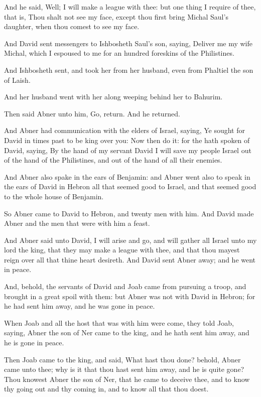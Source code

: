 \verse And he said, Well; I will make a league with thee: but one thing I require of thee, that is, Thou shalt not see my face, except thou first bring Michal Saul's daughter, when thou comest to see my face.

\verse And David sent messengers to Ishbosheth Saul's son, saying, Deliver me my wife Michal, which I espoused to me for an hundred foreskins of the Philistines.

\verse And Ishbosheth sent, and took her from her husband, even from Phaltiel the son of Laish.

\verse And her husband went with her along weeping behind her to Bahurim.

Then said Abner unto him, Go, return. And he returned.

\verse And Abner had communication with the elders of Israel, saying, Ye sought for David in times past to be king over you: \verse Now then do it: for the \LORD hath spoken of David, saying, By the hand of my servant David I will save my people Israel out of the hand of the Philistines, and out of the hand of all their enemies.

\verse And Abner also spake in the ears of Benjamin: and Abner went also to speak in the ears of David in Hebron all that seemed good to Israel, and that seemed good to the whole house of Benjamin.

\verse So Abner came to David to Hebron, and twenty men with him. And David made Abner and the men that were with him a feast.

\verse And Abner said unto David, I will arise and go, and will gather all Israel unto my lord the king, that they may make a league with thee, and that thou mayest reign over all that thine heart desireth.  And David sent Abner away; and he went in peace.

\verse And, behold, the servants of David and Joab came from pursuing a troop, and brought in a great spoil with them: but Abner was not with David in Hebron; for he had sent him away, and he was gone in peace.

\verse When Joab and all the host that was with him were come, they told Joab, saying, Abner the son of Ner came to the king, and he hath sent him away, and he is gone in peace.

\verse Then Joab came to the king, and said, What hast thou done?  behold, Abner came unto thee; why is it that thou hast sent him away, and he is quite gone?  \verse Thou knowest Abner the son of Ner, that he came to deceive thee, and to know thy going out and thy coming in, and to know all that thou doest.

